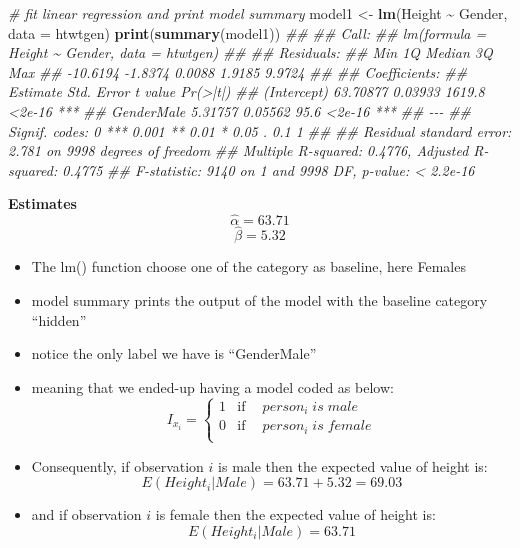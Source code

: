 \documentclass[
]{book}
\newenvironment{Shaded}{\begin{snugshade}}{\end{snugshade}}
\newcommand{\CommentTok}[1]{\textcolor[rgb]{0.56,0.35,0.01}{\textit{#1}}}
\newcommand{\DataTypeTok}[1]{\textcolor[rgb]{0.13,0.29,0.53}{#1}}
\newcommand{\KeywordTok}[1]{\textcolor[rgb]{0.13,0.29,0.53}{\textbf{#1}}}
\newcommand{\NormalTok}[1]{#1}
\newcommand{\OperatorTok}[1]{\textcolor[rgb]{0.81,0.36,0.00}{\textbf{#1}}}
\newcommand{\StringTok}[1]{\textcolor[rgb]{0.31,0.60,0.02}{#1}}
\providecommand{\tightlist}{%
  \setlength{\itemsep}{0pt}\setlength{\parskip}{0pt}}
\theoremstyle{definition}
\theoremstyle{definition}
\theoremstyle{definition}
\theoremstyle{remark}
\begin{document}
\begin{Shaded}
\begin{Highlighting}[]
\CommentTok{\# fit linear regression and print model summary}
\NormalTok{model1 \textless{}{-}}\StringTok{ }\KeywordTok{lm}\NormalTok{(Height }\OperatorTok{\textasciitilde{}}\StringTok{ }\NormalTok{Gender, }\DataTypeTok{data =}\NormalTok{ htwtgen)}
\KeywordTok{print}\NormalTok{(}\KeywordTok{summary}\NormalTok{(model1))}
\CommentTok{\#\# }
\CommentTok{\#\# Call:}
\CommentTok{\#\# lm(formula = Height \textasciitilde{} Gender, data = htwtgen)}
\CommentTok{\#\# }
\CommentTok{\#\# Residuals:}
\CommentTok{\#\#      Min       1Q   Median       3Q      Max }
\CommentTok{\#\# {-}10.6194  {-}1.8374   0.0088   1.9185   9.9724 }
\CommentTok{\#\# }
\CommentTok{\#\# Coefficients:}
\CommentTok{\#\#             Estimate Std. Error t value Pr(\textgreater{}|t|)    }
\CommentTok{\#\# (Intercept) 63.70877    0.03933  1619.8   \textless{}2e{-}16 ***}
\CommentTok{\#\# GenderMale   5.31757    0.05562    95.6   \textless{}2e{-}16 ***}
\CommentTok{\#\# {-}{-}{-}}
\CommentTok{\#\# Signif. codes:  0 \textquotesingle{}***\textquotesingle{} 0.001 \textquotesingle{}**\textquotesingle{} 0.01 \textquotesingle{}*\textquotesingle{} 0.05 \textquotesingle{}.\textquotesingle{} 0.1 \textquotesingle{} \textquotesingle{} 1}
\CommentTok{\#\# }
\CommentTok{\#\# Residual standard error: 2.781 on 9998 degrees of freedom}
\CommentTok{\#\# Multiple R{-}squared:  0.4776,	Adjusted R{-}squared:  0.4775 }
\CommentTok{\#\# F{-}statistic:  9140 on 1 and 9998 DF,  p{-}value: \textless{} 2.2e{-}16}
\end{Highlighting}
\end{Shaded}

\textbf{Estimates}
\[\hat{\alpha} = 63.71\]
\[\hat{\beta} = 5.32\]

\begin{itemize}
\tightlist
\item
  The lm() function choose one of the category as baseline, here Females
\item
  model summary prints the output of the model with the baseline category ``hidden''
\item
  notice the only label we have is ``GenderMale''
\item
  meaning that we ended-up having a model coded as below:
  \begin{equation}
    I_{x_i} =
    \left\{
        \begin{array}{cc}
                1 & \mathrm{if\ } \quad person_i\;is\;male \\
                0 & \mathrm{if\ } \quad person_i\;is\;female \\
        \end{array}
    \right.
  \end{equation}
\item
  Consequently, if observation \(i\) is male then the expected value of height is:
  \[E(Height_i|Male) = 63.71 + 5.32 = 69.03\]
\item
  and if observation \(i\) is female then the expected value of height is:
  \[E(Height_i|Male) = 63.71\]
\end{itemize}
\end{document}
